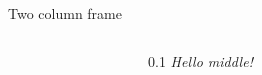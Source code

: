 \documentclass{beamer}
\begin{document}
\begin{frame}[t]{Two column frame}
    \begin{columns}[t]
        \begin{column}{0.4\textwidth}
            \lipsum[1]
        \end{column}
        \begin{column}{0.1\texwidth}
             \textit{Hello middle!}
        \end{column}
        \begin{column}{0.4\textwidth}
           \lipsum[2]
        \end{column}
    \end{columns}
\end{frame}
\end{document}
